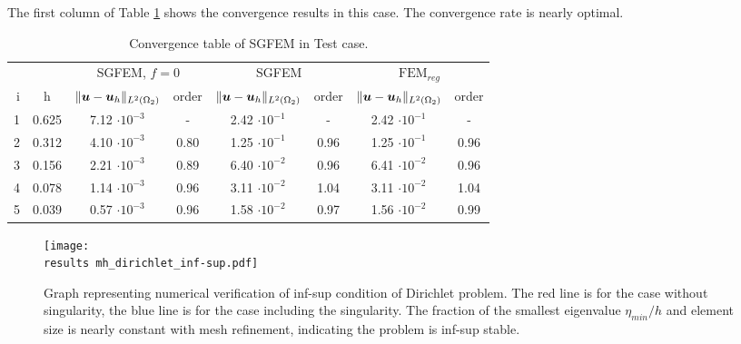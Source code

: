 The first column of Table \ref{tab:convergence_mh_dirichlet} shows the convergence results in this case.
The convergence rate is nearly optimal.
%
\begin{table}[!htb]
\begin{center}
\bgroup
\def\arraystretch{1.2}
\setlength\tabcolsep{5pt}
\begin{tabular}{rc|cc|cc|cc}
\toprule
\multicolumn{2}{c|}{} & \multicolumn{2}{c|}{ SGFEM, $f=0$} & \multicolumn{2}{c|}{SGFEM} & \multicolumn{2}{c}{$\textrm{FEM}_{reg}$}\\ [3pt] %
i & h & $\|\mathbf{\boldsymbol{u}}-\mathbf{\boldsymbol{u}}_h\|_{L^2(\Omega_2)}$ & order & $\|\mathbf{\boldsymbol{u}}-\mathbf{\boldsymbol{u}}_h\|_{L^2(\Omega_2)}$
    & order & $\|\mathbf{\boldsymbol{u}}-\mathbf{\boldsymbol{u}}_h\|_{L^2(\Omega_2)}$ & order \\ [3pt] \midrule
1 & 0.625 &  7.12 $\cdot10^{-3}$  &  -   &  2.42 $\cdot10^{-1}$  &  -   & 2.42 $\cdot10^{-1}$  &   -   \\
2 & 0.312 &  4.10 $\cdot10^{-3}$  & 0.80 &  1.25 $\cdot10^{-1}$  & 0.96 & 1.25 $\cdot10^{-1}$ &  0.96 \\
3 & 0.156 &  2.21 $\cdot10^{-3}$  & 0.89 &  6.40 $\cdot10^{-2}$  & 0.96 & 6.41 $\cdot10^{-2}$ &  0.96 \\
4 & 0.078 &  1.14 $\cdot10^{-3}$  & 0.96 &  3.11 $\cdot10^{-2}$  & 1.04 & 3.11 $\cdot10^{-2}$ &  1.04 \\
5 & 0.039 &  0.57 $\cdot10^{-3}$  & 0.96 &  1.58 $\cdot10^{-2}$  & 0.97 & 1.56 $\cdot10^{-2}$ &  0.99 \\
\bottomrule
\end{tabular}
\caption{Convergence table of SGFEM in Test case.}
\label{tab:convergence_mh_dirichlet}
\egroup
\end{center}
\end{table}

%
\begin{figure}[!hb]
    \centering    
    \texttt{[image: \\results mh\_dirichlet\_inf-sup.pdf]} 
    \caption[numerical verification of inf-sup condition]
  {Graph representing numerical verification of inf-sup condition of Dirichlet problem.
  The red line is for the case without singularity, the blue line is for the case including the singularity.
  The fraction of the smallest eigenvalue $\eta_{min}/h$ and element size is nearly constant with mesh refinement,
  indicating the problem is inf-sup stable.}
  \label{fig:mh_dirichlet_inf-sup}
\end{figure}
%


